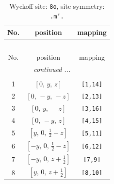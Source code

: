 \documentclass[fleqn,8pt]{jsarticle}
\begin{document}
\renewcommand{\arraystretch}{1.2}
\begin{longtable}{ccc}
\caption{Wyckoff site: {\tt 8o}, site symmetry: {\tt .m'.}}
 \\
 \hline \hline
No. & position & mapping \\ \hline \endfirsthead

\multicolumn{2}{l}{\tablename\ \thetable{}} \\
 \hline \hline
No. & position & mapping \\ \hline \endhead

 \hline \hline
\multicolumn{2}{r}{\footnotesize\it continued ...} \\ \endfoot

 \hline \hline
\multicolumn{2}{r}{} \\ \endlastfoot

1 & $\left[ 0,\, y,\, z \right]$ & {\tt [1,14]} \\ \hline
2 & $\left[ 0,\, - y,\, - z \right]$ & {\tt [2,13]} \\ \hline
3 & $\left[ 0,\, y,\, - z \right]$ & {\tt [3,16]} \\ \hline
4 & $\left[ 0,\, - y,\, z \right]$ & {\tt [4,15]} \\ \hline
5 & $\left[ y,\, 0,\, \frac{1}{2} - z \right]$ & {\tt [5,11]} \\ \hline
6 & $\left[ - y,\, 0,\, \frac{1}{2} - z \right]$ & {\tt [6,12]} \\ \hline
7 & $\left[ - y,\, 0,\, z + \frac{1}{2} \right]$ & {\tt [7,9]} \\ \hline
8 & $\left[ y,\, 0,\, z + \frac{1}{2} \right]$ & {\tt [8,10]} \\
\end{longtable}
\renewcommand{\arraystretch}{1.2}
\end{document}
